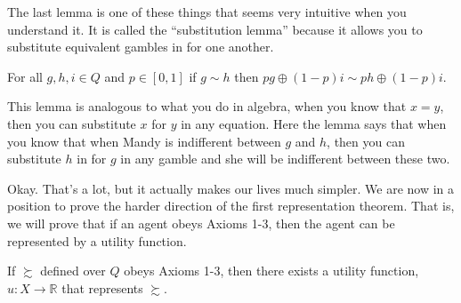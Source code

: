 The last lemma is one of these things that seems very intuitive when you understand it.  It is called the ``substitution lemma'' because it allows you to substitute equivalent gambles in for one another.  

\begin{lemma}
\label{l:vn-substitution}
For all $g, h, i \in Q$ and $p \in [0,1]$ if $g \sim h$ then $pg \oplus (1-p) i \sim ph \oplus (1-p) i$.
\end{lemma}

This lemma is analogous to what you do in algebra, when you know that $x = y$, then you can substitute $x$ for $y$ in any equation.  Here the lemma says that when you know that when Mandy is indifferent between $g$ and $h$, then you can substitute $h$ in for $g$ in any gamble and she will be indifferent between these two.

Okay. That's a lot, but it actually makes our lives much simpler. We are now in a position to prove the harder direction of the first representation theorem.  That is, we will prove that if an agent obeys Axioms 1-3, then the agent can be represented by a utility function.

\begin{proposition}
If $\succsim$ defined over $Q$ obeys Axioms 1-3, then there exists a utility function, $u: X \to \mathbb{R}$ that represents $\succsim$.
\end{proposition}

